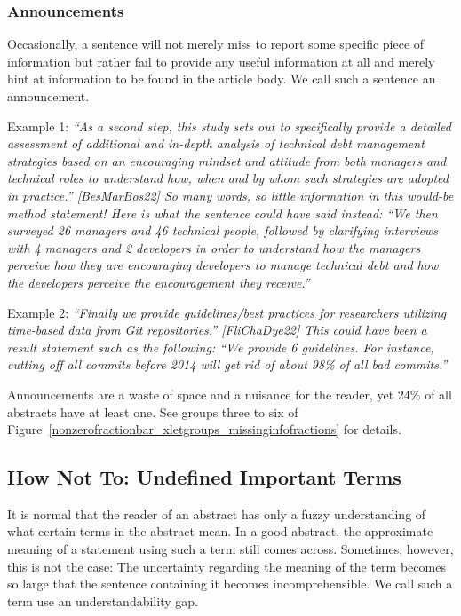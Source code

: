 \documentclass[10pt,journal,compsoc]{IEEEtran}
\newcommand{\Art}[1]{\bgroup[#1]\egroup} %
\newcommand{\Quote}[1]{\bgroup\itshape ``#1''\egroup}  %
\newcommand{\Pseudoquote}[1]{\bgroup\itshape ``#1''\egroup}  %
\begin{document}
\subsubsection{Announcements}\label{announcements}

Occasionally, a sentence will not merely miss to report some specific piece of information
but rather fail to provide any useful information at all and merely hint at
information to be found in the article body.
We call such a sentence an announcement.

Example 1:
\Quote{As a second step, this study sets out to specifically
  provide a detailed assessment of additional and in-depth analysis of technical debt management strategies based
  on an encouraging mindset and attitude from both managers and technical roles to understand how, when and by
  whom such strategies are adopted in practice.} \Art{BesMarBos22}
So many words, so little information in this would-be method statement!
Here is what the sentence could have said instead:
\Pseudoquote{We then surveyed 26 managers and 46 technical people, followed by clarifying interviews
  with 4 managers and 2 developers in order to understand how the managers perceive how they are encouraging
  developers to manage technical debt and how the developers perceive the encouragement they receive.}

Example 2:
\Quote{Finally we provide guidelines/best practices for researchers utilizing time-based data
from Git repositories.} \Art{FliChaDye22}  %
This could have been a result statement such as the following:
\Pseudoquote{We provide 6 guidelines. For instance, cutting off all commits before 2014
  will get rid of about 98\% of all bad commits.}

Announcements are a waste of space and a nuisance for the reader,
yet 24\% of all abstracts have at least one.
See groups three to six of Figure~\ref{nonzerofractionbar_xletgroups_missinginfofractions}
for details.


\subsection{How Not To: Undefined Important Terms}\label{ugaps}

It is normal that the reader of an abstract has only a fuzzy understanding
of what certain terms in the abstract mean.
In a good abstract, the approximate meaning of a statement using such a term
still comes across.
Sometimes, however, this is not the case:
The uncertainty regarding the meaning of the term becomes so large
that the sentence containing it becomes incomprehensible.
We call such a term use an understandability gap.
\end{document}
